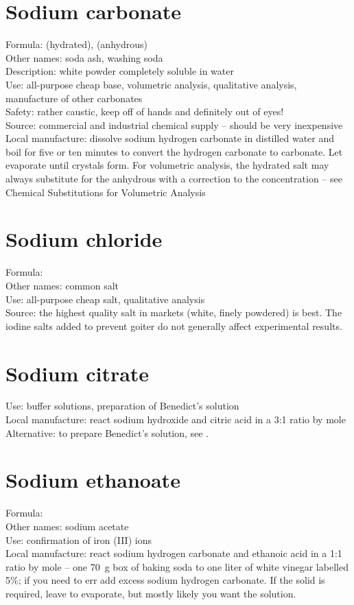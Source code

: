 \section{Sodium carbonate}
Formula:  (hydrated), 
 (anhydrous)\\
Other names: soda ash, washing soda\\
Description: white powder completely soluble in water\\
Use: all-purpose cheap base, 
volumetric analysis, 
qualitative analysis, 
manufacture of other carbonates\\
Safety: rather caustic, keep off of hands and definitely out of eyes!\\
Source: commercial and industrial chemical supply -- 
should be very inexpensive\\
Local manufacture: dissolve sodium hydrogen carbonate in distilled water 
and boil for five or ten minutes 
to convert the hydrogen carbonate to carbonate. 
Let evaporate until crystals form. 
For volumetric analysis, 
the hydrated salt may always substitute 
for the anhydrous with a correction to the concentration -- 
see Chemical Substitutions for Volumetric Analysis

\section{Sodium chloride}
Formula: \\
Other names: common salt\\
Use: all-purpose cheap salt, 
qualitative analysis\\
Source: the highest quality salt in markets (white, 
finely powdered) is best. 
The iodine salts added to prevent goiter 
do not generally affect experimental results.

\section{Sodium citrate}
Use: buffer solutions, 
preparation of Benedict's solution\\
Local manufacture: react sodium hydroxide 
and citric acid in a 3:1 ratio by mole\\
Alternative: to prepare Benedict's solution, 
see .

\section{Sodium ethanoate}
\label{sec:sodiumeth}
Formula: \\
Other names: sodium acetate\\
Use: confirmation of iron (III) ions\\
Local manufacture: react sodium hydrogen carbonate 
and ethanoic acid in a 1:1 ratio by mole -- 
one 70~g box of baking soda to one liter of white vinegar labelled 5\%; 
if you need to err add excess sodium hydrogen carbonate. 
If the solid is required, 
leave to evaporate, 
but mostly likely you want the solution.

